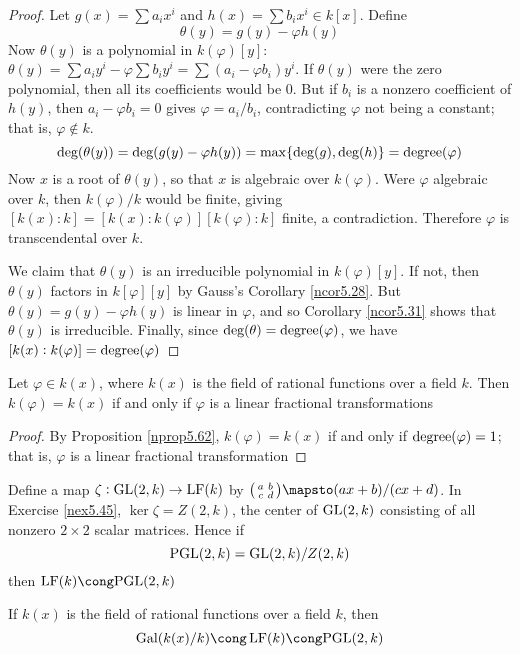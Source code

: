 \documentclass[11pt]{article}
\begin{document}
\begin{proof}
Let \(g(x)=\sum a_ix^i\) and \(h(x)=\sum b_ix^i\in k[x]\). Define
\begin{equation*}
\theta(y)=g(y)-\varphi h(y)
\end{equation*}
Now \(\theta(y)\) is a polynomial in \(k(\varphi)[y]\): 
\(\theta(y)=\sum a_iy^i-\varphi\sum b_iy^i=\sum(a_i-\varphi b_i)y^i\). If \(\theta(y)\)
were the zero polynomial, then all its coefficients would be 0. But if \(b_i\)
is a nonzero coefficient of \(h(y)\), then \(a_i-\varphi b_i=0\) gives
\(\varphi=a_i/b_i\), contradicting \(\varphi\) not being a constant; that is,
\(\varphi\not\in k\).
\begin{equation*}
\text{deg}(\theta(y))=\text{deg}(g(y)-\varphi h(y))=\max\{\text{deg}(g),\text{deg}(h)\}=\text{degree}(\varphi)
\end{equation*}
Now \(x\) is a root of \(\theta(y)\), so that \(x\) is algebraic over \(k(\varphi)\).
Were \(\varphi\) algebraic over \(k\), then \(k(\varphi)/k\) would be finite, giving 
\([k(x):k]=[k(x):k(\varphi)][k(\varphi):k]\) finite, a contradiction. Therefore \(\varphi\)
is transcendental over \(k\).

We claim that \(\theta(y)\) is an irreducible polynomial in \(k(\varphi)[y]\). If not,
then \(\theta(y)\) factors in \(k[\varphi][y]\) by Gauss's Corollary \ref{ncor5.28}. 
But \(\theta(y)=g(y)-\varphi h(y)\) is linear in \(\varphi\), and so Corollary \ref{ncor5.31}
shows that \(\theta(y)\) is irreducible. Finally, since \(\text{deg}(\theta)=\text{degree}(\varphi)\), we
have \([k(x):k(\varphi)]=\text{degree}(\varphi)\)
\end{proof}

\begin{corollary}[]
\label{ncor5.63}
Let \(\varphi\in k(x)\), where \(k(x)\) is the field of rational functions
over a field \(k\). Then \(k(\varphi)=k(x)\) if and only if \(\varphi\) is a linear fractional
transformations 
\end{corollary}

\begin{proof}
By Proposition \ref{nprop5.62}, \(k(\varphi)=k(x)\) if and only if \(\text{degree}(\varphi)=1\);
that is, \(\varphi\) is a linear fractional transformation
\end{proof}

Define a map \(\zeta:\text{GL}(2,k)\to\operatorname{LF}(k)\) by 
\(\begin{psmallmatrix}a&b\\c&d\end{psmallmatrix}\mapsto(ax+b)/(cx+d)\). In
Exercise \ref{nex5.45}, \(\ker\zeta=Z(2,k)\), the center of \(\text{GL}(2,k)\)
consisting of all nonzero \(2\times 2\) scalar matrices. Hence if
\begin{equation*}
\text{PGL}(2,k)=\text{GL}(2,k)/Z(2,k)
\end{equation*}
then \(\LF(k)\cong\PGL(2,k)\)
\begin{corollary}[]
If \(k(x)\) is the field of rational functions over a field \(k\), then 
\begin{equation*}
\Gal(k(x)/k)\cong\LF(k)\cong\PGL(2,k)
\end{equation*}
\end{corollary}
\end{document}
